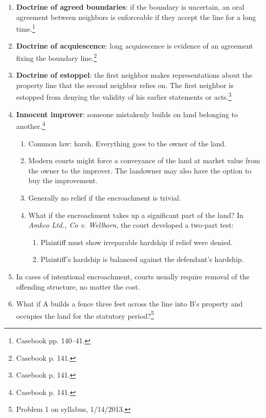 \begin{enumerate}
    \item \textbf{Doctrine of agreed boundaries}: if the boundary is 
    uncertain, an oral agreement between neighbors is enforceable if they 
    accept the line for a long time.\footnote{Casebook pp. 140--41.}
    \item \textbf{Doctrine of acquiescence}: long acquiescence is evidence of 
    an agreement fixing the boundary line.\footnote{Casebook p. 141.}
    \item \textbf{Doctrine of estoppel}: the first neighbor makes 
    representations about the property line that the second neighbor relies 
    on. The first neighbor is estopped from denying the validity of his 
    earlier statements or acts.\footnote{Casebook p. 141.}
    \item \textbf{Innocent improver}: someone mistakenly builds on land 
    belonging to another.\footnote{Casebook p. 141.}
    \begin{enumerate}
        \item Common law: harsh. Everything goes to the owner of the land.
        \item Modern courts might force a conveyance of the land at market 
        value from the owner to the improver. The landowner may also have the 
        option to buy the improvement.
        \item Generally no relief if the encroachment is trivial.
        \item What if the encroachment takes up a significant part of the 
        land? In \emph{Amkco Ltd., Co v. Wellborn}, the court developed a 
        two-part test:
        \begin{enumerate}
            \item Plaintiff must show irreparable hardship if relief were 
            denied.
            \item Plaintiff's hardship is balanced against the defendant's 
            hardship.
        \end{enumerate}
    \end{enumerate}
    \item In cases of intentional encroachment, courts usually require removal 
    of the offending structure, no matter the cost.
    \item What if A builds a fence three feet across the line into B's 
    property and occupies the land for the statutory period?\footnote{Problem 
    1 on syllabus, 1/14/2013.}

\end{enumerate}
